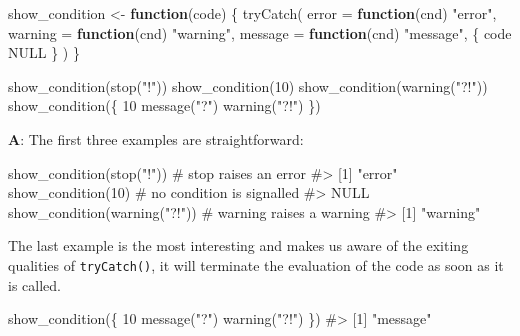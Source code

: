 \documentclass[
]{krantz}
\makeatletter
\newenvironment{Shaded}{\begin{snugshade}}{\end{snugshade}}
\newcommand{\CommentTok}[1]{\textcolor[rgb]{0.56,0.35,0.01}{\textit{#1}}}
\newcommand{\ControlFlowTok}[1]{\textcolor[rgb]{0.13,0.29,0.53}{\textbf{#1}}}
\newcommand{\DataTypeTok}[1]{\textcolor[rgb]{0.13,0.29,0.53}{#1}}
\newcommand{\DecValTok}[1]{\textcolor[rgb]{0.00,0.00,0.81}{#1}}
\newcommand{\KeywordTok}[1]{\textcolor[rgb]{0.13,0.29,0.53}{\textbf{#1}}}
\newcommand{\NormalTok}[1]{#1}
\newcommand{\OtherTok}[1]{\textcolor[rgb]{0.56,0.35,0.01}{#1}}
\newcommand{\StringTok}[1]{\textcolor[rgb]{0.31,0.60,0.02}{#1}}
\newenvironment{kframe}{%
\medskip{}
\setlength{\fboxsep}{.8em}
 \def\at@end@of@kframe{}%
 \ifinner\ifhmode%
  \def\at@end@of@kframe{\end{minipage}}%
  \begin{minipage}{\columnwidth}%
 \fi\fi%
 \def\FrameCommand##1{\hskip\@totalleftmargin \hskip-\fboxsep
 \colorbox{shadecolor}{##1}\hskip-\fboxsep
     \hskip-\linewidth \hskip-\@totalleftmargin \hskip\columnwidth}%
 \MakeFramed {\advance\hsize-\width
   \@totalleftmargin\z@ \linewidth\hsize
   \@setminipage}}%
 {\par\unskip\endMakeFramed%
 \at@end@of@kframe}
\renewenvironment{Shaded}{\begin{kframe}}{\end{kframe}}
\renewcommand{\KeywordTok} [1]{\textcolor[rgb]{0.00,0.44,0.13}{{#1}}}
\renewcommand{\DataTypeTok}[1]{\textcolor[rgb]{0.56,0.13,0.00}{{#1}}}
\renewcommand{\DecValTok}  [1]{\textcolor[rgb]{0.25,0.63,0.44}{{#1}}}
\renewcommand{\StringTok}  [1]{\textcolor[rgb]{0.25,0.44,0.63}{{#1}}}
\renewcommand{\CommentTok} [1]{\textcolor[rgb]{0.38,0.63,0.69}{{#1}}}
\renewcommand{\OtherTok}   [1]{\textcolor[rgb]{0.00,0.44,0.13}{{#1}}}
\renewcommand{\NormalTok}  [1]{{#1}}
\makeatother
\begin{document}
\begin{Shaded}
\begin{Highlighting}[]
\NormalTok{show_condition <-}\StringTok{ }\ControlFlowTok{function}\NormalTok{(code) \{}
  \KeywordTok{tryCatch}\NormalTok{(}
    \DataTypeTok{error =} \ControlFlowTok{function}\NormalTok{(cnd) }\StringTok{"error"}\NormalTok{,}
    \DataTypeTok{warning =} \ControlFlowTok{function}\NormalTok{(cnd) }\StringTok{"warning"}\NormalTok{,}
    \DataTypeTok{message =} \ControlFlowTok{function}\NormalTok{(cnd) }\StringTok{"message"}\NormalTok{,}
\NormalTok{    \{}
\NormalTok{      code}
      \OtherTok{NULL}
\NormalTok{    \}}
\NormalTok{  )}
\NormalTok{\}}


\KeywordTok{show_condition}\NormalTok{(}\KeywordTok{stop}\NormalTok{(}\StringTok{"!"}\NormalTok{))}
\KeywordTok{show_condition}\NormalTok{(}\DecValTok{10}\NormalTok{)}
\KeywordTok{show_condition}\NormalTok{(}\KeywordTok{warning}\NormalTok{(}\StringTok{"?!"}\NormalTok{))}
\KeywordTok{show_condition}\NormalTok{(\{}
  \DecValTok{10}
  \KeywordTok{message}\NormalTok{(}\StringTok{"?"}\NormalTok{)}
  \KeywordTok{warning}\NormalTok{(}\StringTok{"?!"}\NormalTok{)}
\NormalTok{\})}
\end{Highlighting}
\end{Shaded}

\textbf{{A}}: The first three examples are straightforward:

\begin{Shaded}
\begin{Highlighting}[]
\KeywordTok{show_condition}\NormalTok{(}\KeywordTok{stop}\NormalTok{(}\StringTok{"!"}\NormalTok{))      }\CommentTok{# stop raises an error}
\CommentTok{#> [1] "error"}
\KeywordTok{show_condition}\NormalTok{(}\DecValTok{10}\NormalTok{)             }\CommentTok{# no condition is signalled}
\CommentTok{#> NULL}
\KeywordTok{show_condition}\NormalTok{(}\KeywordTok{warning}\NormalTok{(}\StringTok{"?!"}\NormalTok{))  }\CommentTok{# warning raises a warning}
\CommentTok{#> [1] "warning"}
\end{Highlighting}
\end{Shaded}

The last example is the most interesting and makes us aware of the exiting qualities of \texttt{tryCatch()}, it will terminate the evaluation of the code as soon as it is called.

\begin{Shaded}
\begin{Highlighting}[]
\KeywordTok{show_condition}\NormalTok{(\{}
  \DecValTok{10}
  \KeywordTok{message}\NormalTok{(}\StringTok{"?"}\NormalTok{)}
  \KeywordTok{warning}\NormalTok{(}\StringTok{"?!"}\NormalTok{)}
\NormalTok{\})}
\CommentTok{#> [1] "message"}
\end{Highlighting}
\end{Shaded}
\end{document}

